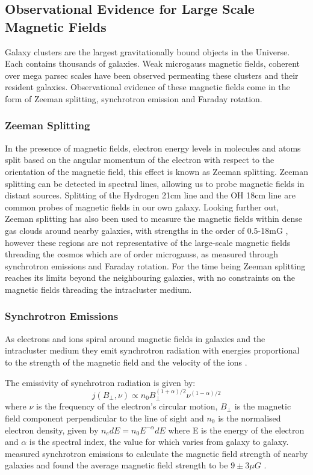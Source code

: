 \subsection{Observational Evidence for Large Scale Magnetic Fields}

Galaxy clusters are the largest gravitationally bound objects in the Universe. Each contains thousands of galaxies. Weak microgauss magnetic fields, coherent over mega parsec scales have been observed permeating these clusters and their resident galaxies. Observational evidence of these magnetic fields come in the form of Zeeman splitting, synchrotron emission and Faraday rotation.

\subsubsection{Zeeman Splitting}

In the presence of magnetic fields, electron energy levels in molecules and atoms split based on the angular momentum of the electron with respect to the orientation of the magnetic field, this effect is known as Zeeman splitting. Zeeman splitting can be detected in spectral lines, allowing us to probe magnetic fields in distant sources. Splitting of the Hydrogen 21cm line and the OH 18cm line are common probes of magnetic fields in our own galaxy. Looking further out, Zeeman splitting has also been used to measure the magnetic fields within dense gas clouds around nearby galaxies, with strengths in the order of 0.5-18mG \cite{Robishaw:2008ti}, however these regions are not representative of the large-scale magnetic fields threading the cosmos which are of order microgauss, as measured through synchrotron emissions and Faraday rotation. For the time being Zeeman splitting reaches its limits beyond the neighbouring galaxies, with no constraints on the magnetic fields threading the intracluster medium.

\subsubsection{Synchrotron Emissions}

As electrons and ions spiral around magnetic fields in galaxies and the intracluster medium they emit synchrotron radiation with energies proportional to the strength of the magnetic field and the velocity of the ions \cite{Giovannini:2003yn}.

The emissivity of synchrotron radiation is given by:
\begin{equation}
\label{eqn:synchrotron}
j(B_{\bot},\nu) \propto n_0 B_{\bot}^{(1+\alpha)/2} \nu ^{(1-\alpha)/2}
\end{equation}
where $\nu$ is the frequency of the electron's circular motion, $B_{\bot}$ is the magnetic field component perpendicular to the line of sight and $n_0$ is the normalised electron density, given by $n_e dE = n_0 E^{-\alpha} dE$ where E is the energy of the electron and $\alpha$ is the spectral index, the value for which varies from galaxy to galaxy. \cite{1991A&A...241...47B} measured synchrotron emissions to calculate the magnetic field strength of nearby galaxies and found the average magnetic field strength to be $9 \pm 3 \mu G$ \cite{1991A&A...241...47B}.

